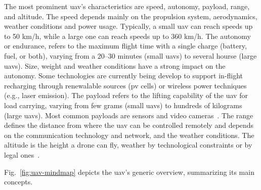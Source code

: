 The most prominent \gls{uav}'s characteristics are speed, autonomy, payload,
range, and altitude. The speed depends mainly on the propulsion system,
aerodynamics, weather conditions and power usage. Typically, a small
\gls{uav} can reach speeds up to 50 km/h, while a large one can reach speeds up
to 360 km/h\cite{mohsan2022towards}.
The autonomy or endurance, refers to the maximum flight time with a
single charge (battery, fuel, or both), varying from a 20--30 minutes (small \glspl{uav}) to several
hourse (large \glspl{uav}). Size, weight and weather conditions have a strong
impact on the autonomy. Some technologies are currently being develop to support
in-flight recharging through renewalable sources (\gls{pv} cells) or wireless
power techniques (e.g., laser emission)\cite{mohsan2022towards}.
The payload refers to the lifting capability of the \gls{uav} for load carrying,
varying from few grams (small \glspl{uav}) to hundreds of kilograms (large
\glspl{uav}). Most common payloads are sensors and video cameras~\cite{mohsan2022towards}.
The range defines the distance from where the \gls{uav} can be controlled
remotely and depends on the communication technology and network, and the
weather conditions\cite{mohsan2022towards}. The altitude is the height a drone can fly, weather by
technological constraints or by legal ones~\cite{mohsan2022towards}.

Fig.~\ref{fig:uav-mindmap} depicts the \gls{uav}'s
generic overview, summarizing its main concepts.

